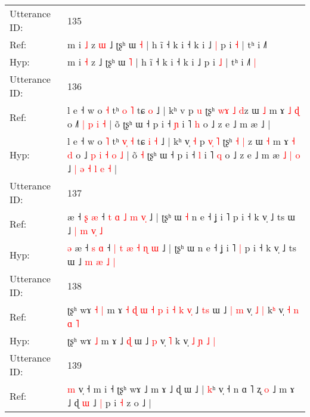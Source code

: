 \documentclass[10pt]{article}
\DeclareRobustCommand{\hl}[1]{{\textcolor{red}{#1}}}
\begin{document}
\begin{longtable}{ll}
\midrule
Utterance ID: & 135 \\
Ref: & m i \hl{˩} z\hl{ }\hl{ɯ} ˩ ʈʂʰ ɯ \hl{˧} | h ĩ ˧ k i ˧ k i ˩\hl{ }\hl{|} p i \hl{˧} | tʰ i ˩˥\hl{}\hl{}
 \\
Hyp: & m i \hl{˧} z\hl{}\hl{} ˩ ʈʂʰ ɯ \hl{˥} | h ĩ ˧ k i ˧ k i ˩\hl{}\hl{} p i \hl{˩} | tʰ i ˩˥\hl{ }\hl{|}
 \\
\midrule
Utterance ID: & 136 \\
Ref: & l e ˧ w o \hl{˧} tʰ \hl{}\hl{o} \hl{˥} tɕ\hl{}\hl{} \hl{o} ˩ | kʰ v\hl{}\hl{}\hl{} p\hl{}\hl{}\hl{} \hl{u} ʈʂʰ \hl{w}\hl{ɤ} \hl{˩} \hl{d}z ɯ \hl{˩} m ɤ \hl{˩} \hl{ɖ} o ˩\hl{}\hl{˥} \hl{|} \hl{p} \hl{i} \hl{˧} | õ\hl{}\hl{} ʈʂʰ ɯ ˧ p i ˧ \hl{ɲ} i ˥ \hl{h} o ˩ z e ˩ m æ\hl{}\hl{}\hl{}\hl{}\hl{}\hl{} ˩\hl{}\hl{}\hl{}\hl{}\hl{}\hl{}\hl{}\hl{}\hl{}\hl{}\hl{}\hl{} |
 \\
Hyp: & l e ˧ w o \hl{˥} tʰ \hl{v}\hl{̩} \hl{˧} tɕ\hl{ }\hl{i} \hl{˧} ˩ | kʰ v\hl{̩}\hl{ }\hl{˧} p\hl{ }\hl{v}\hl{̩} \hl{˥} ʈʂʰ \hl{}\hl{˧} \hl{|} \hl{}z ɯ \hl{˧} m ɤ \hl{˧} \hl{d} o ˩\hl{ }\hl{p} \hl{i} \hl{˧} \hl{o} \hl{˩} | õ\hl{ }\hl{˧} ʈʂʰ ɯ ˧ p i ˧ \hl{l} i ˥ \hl{q} o ˩ z e ˩ m æ\hl{ }\hl{˩}\hl{ }\hl{|}\hl{ }\hl{o} ˩\hl{ }\hl{|}\hl{ }\hl{ə}\hl{ }\hl{˧}\hl{ }\hl{l}\hl{ }\hl{e}\hl{ }\hl{˧} |
 \\
\midrule
Utterance ID: & 137 \\
Ref: & \hl{}\hl{}æ ˧ \hl{ʂ} \hl{æ} ˧ \hl{t} \hl{ɑ} \hl{˩} \hl{m} \hl{}\hl{v}\hl{̩} ˩ | ʈʂʰ ɯ\hl{ }\hl{˧} n e ˧ ʝ i ˥\hl{}\hl{} p i ˧ k v̩ ˩ ts ɯ ˩ \hl{|} \hl{m} \hl{v}\hl{̩} \hl{˩}
 \\
Hyp: & \hl{ə}\hl{ }æ ˧ \hl{s} \hl{ɑ} ˧ \hl{|} \hl{t} \hl{æ} \hl{˧} \hl{ɳ}\hl{ }\hl{ɯ} ˩ | ʈʂʰ ɯ\hl{}\hl{} n e ˧ ʝ i ˥\hl{ }\hl{|} p i ˧ k v̩ ˩ ts ɯ ˩ \hl{m} \hl{æ} \hl{}\hl{˩} \hl{|}
 \\
\midrule
Utterance ID: & 138 \\
Ref: & ʈʂʰ wɤ\hl{ }\hl{˧} \hl{|} m ɤ\hl{ }\hl{˧}\hl{ }\hl{ɖ}\hl{ }\hl{ɯ}\hl{ }\hl{˧}\hl{ }\hl{p}\hl{ }\hl{i}\hl{ }\hl{˧}\hl{ }\hl{k}\hl{ }\hl{v}\hl{̩} ˩ \hl{t}\hl{s} ɯ ˩\hl{ }\hl{|} \hl{m} v̩\hl{ }\hl{˩} \hl{|} k\hl{ʰ} v̩ \hl{˧} \hl{n} \hl{ɑ} \hl{˥}
 \\
Hyp: & ʈʂʰ wɤ\hl{}\hl{} \hl{˩} m ɤ\hl{}\hl{}\hl{}\hl{}\hl{}\hl{}\hl{}\hl{}\hl{}\hl{}\hl{}\hl{}\hl{}\hl{}\hl{}\hl{}\hl{}\hl{}\hl{} ˩ \hl{}\hl{ɖ} ɯ ˩\hl{}\hl{} \hl{p} v̩\hl{}\hl{} \hl{˥} k\hl{} v̩ \hl{˩} \hl{ɲ} \hl{˩} \hl{|}
 \\
\midrule
Utterance ID: & 139 \\
Ref: & \hl{m}\hl{ }v̩ ˧ m i ˧ ʈʂʰ wɤ ˩ m ɤ ˩ ɖ ɯ ˩ | \hl{k}ʰ v̩ ˧ n ɑ ˥ ʐ \hl{}\hl{o} ˩ m ɤ ˩ ɖ\hl{ }\hl{ɯ} ˩\hl{ }\hl{|} p i \hl{˧} z o ˩ |

\end{longtable}
\end{document}
